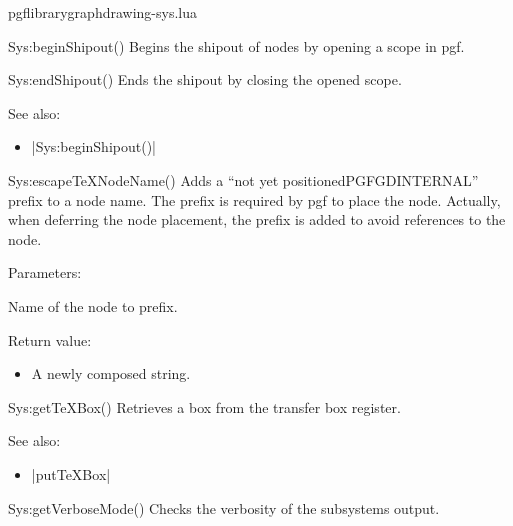 
\begin{filedescription}{pgflibrarygraphdrawing-sys.lua}


\begin{luacommand}{{Sys:beginShipout}()}
Begins the shipout of nodes by opening a scope in pgf.



\end{luacommand}\begin{luacommand}{{Sys:endShipout}()}
Ends the shipout by closing the opened scope.



See also:
\begin{itemize}
	\item[] |Sys:beginShipout()|
\end{itemize}

\end{luacommand}\begin{luacommand}{{Sys:escapeTeXNodeName}()}
Adds a ``not yet positionedPGFGDINTERNAL'' prefix to a node name. The prefix is required by pgf to place the node. Actually, when deferring the node placement, the prefix is added to avoid references to the node.

Parameters:
\begin{parameterdescription}
	\item[\meta{nodename}] Name of the node to prefix.
\end{parameterdescription}


Return value:
\begin{itemize} \item[] A newly composed string. \end{itemize}


\end{luacommand}\begin{luacommand}{{Sys:getTeXBox}()}
Retrieves a box from the transfer box register.



See also:
\begin{itemize}
	\item[] |putTeXBox|
\end{itemize}

\end{luacommand}\begin{luacommand}{{Sys:getVerboseMode}()}
Checks the verbosity of the subsystems output.



\end{luacommand}
\end{filedescription}
